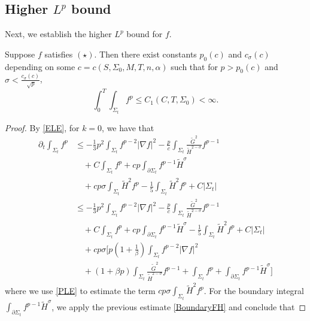 \subsection{Higher $L^p$ bound}
Next, we establish the higher $L^p$ bound for $f$.

\begin{lemma} \label{hlp}
    Suppose $f$ satisfies $(\star)$. Then there exist constants $p_0(c)$ and $c_\sigma (c)$ depending on some $c=c(S, \Sigma_0,M,T,n,\alpha )$ such that for $p>p_0(c)$ and $\sigma < \frac{c_{\sigma }(c)}{\sqrt[]{p}}$,
    \[\int_{0}^{T}\int_{\Sigma_t} f^p \leq C_1(C,T,\Sigma_0)<\infty .\]  
\end{lemma}

\begin{proof}
    By \autoref{ELE}, for $k=0$, we have that
    \begin{equation*}
    \begin{split}
        \partial_t \int_{\Sigma_t} f^p
        &\leq   -\frac{1}{3}p^2 \int_{\Sigma_t} f^{p-2}\left| \nabla f \right| ^2   -\frac{p}{c} \int_{\Sigma_t} \frac{\tilde{G}^2}{\tilde{H}^{2-\sigma }}f^{p-1}\\
        &\quad +C \int_{\Sigma_t} f^p+cp\int_{\partial \Sigma_t} f^{p-1}\tilde{H}^{\sigma }\\
        &\quad +cp \sigma \int_{\Sigma_t}^{}\tilde{H}^2f^p-\frac{1}{5}\int_{\Sigma_t} \tilde{H}^2f^{p}+C \left| \Sigma_t \right| \\
        &\leq   -\frac{1}{3}p^2 \int_{\Sigma_t} f^{p-2}\left| \nabla f \right| ^2   -\frac{p}{c} \int_{\Sigma_t} \frac{\tilde{G}^2}{\tilde{H}^{2-\sigma }}f^{p-1}\\
        &\quad +C \int_{\Sigma_t} f^p+cp\int_{\partial \Sigma_t} f^{p-1}\tilde{H}^{\sigma } -\frac{1}{5}\int_{\Sigma_t} \tilde{H}^2f^{p}+C \left| \Sigma_t \right| \\
        &\quad +cp \sigma [ p \left( 1+\frac{1}{\beta } \right) \int_{\Sigma_t} f^{p-2}\left| \nabla f \right| ^2   \\
        &\quad +\left( 1+\beta p \right) \int_{\Sigma_t} \frac{\tilde{G}^2}{\tilde{H}^{2-\sigma }}f^{p-1} +\int_{\Sigma_t} f^p+\int_{\partial \Sigma_t} f^{p-1}\tilde{H}^{\sigma } ] 
    \end{split}
    \end{equation*} 
    where we use \autoref{PLE} to estimate the term $cp \sigma \int_{\Sigma_t}^{}\tilde{H}^2f^p$.
    For the boundary integral $\int_{\partial \Sigma_t} f^{p-1}\tilde{H}^{\sigma }$, we apply the previous estimate \autoref{BoundaryFH} and conclude that 

\end{proof}
